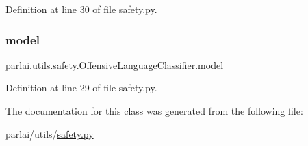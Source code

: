 Definition at line 30 of file safety.\+py.

\mbox{\label{classparlai_1_1utils_1_1safety_1_1OffensiveLanguageClassifier_a917240edc6718f3b7f3560214780ac9d}} 
\subsubsection{\texorpdfstring{model}{model}}
{\footnotesize\ttfamily parlai.\+utils.\+safety.\+Offensive\+Language\+Classifier.\+model}



Definition at line 29 of file safety.\+py.



The documentation for this class was generated from the following file\+:\begin{DoxyCompactItemize}
\item 
parlai/utils/\hyperlink{safety_8py}{safety.\+py}\end{DoxyCompactItemize}
